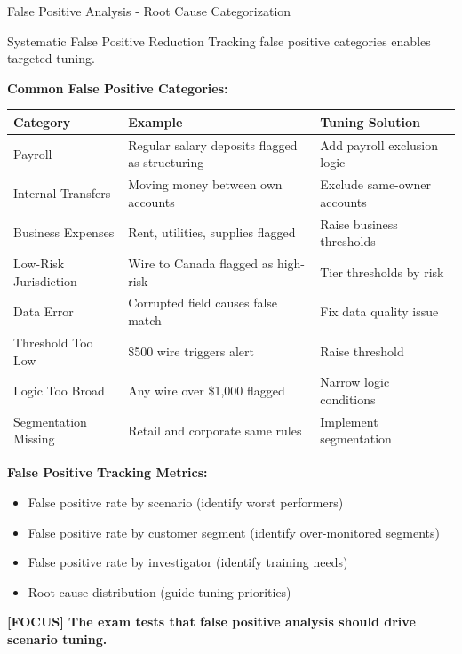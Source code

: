 \documentclass[11pt,a4paper]{beamer}
\newcommand{\examfocus}[1]{\textcolor{orange!80!black}{\textbf{[FOCUS] #1}}}
\begin{document}
	\begin{frame}{False Positive Analysis - Root Cause Categorization}
	\begin{block}{Systematic False Positive Reduction}
		Tracking false positive categories enables targeted tuning.
	\end{block}
	
	\textbf{Common False Positive Categories:}
	\begin{longtable}{p{}|p{}|p{}}
		\hline
		\rowcolor{lightgray}
		\textbf{Category} & \textbf{Example} & \textbf{Tuning Solution} \\
		\hline
		Payroll & Regular salary deposits flagged as structuring & Add payroll exclusion logic \\
		\hline
		Internal Transfers & Moving money between own accounts & Exclude same-owner accounts \\
		\hline
		Business Expenses & Rent, utilities, supplies flagged & Raise business thresholds \\
		\hline
		Low-Risk Jurisdiction & Wire to Canada flagged as high-risk & Tier thresholds by risk \\
		\hline
		Data Error & Corrupted field causes false match & Fix data quality issue \\
		\hline
		Threshold Too Low & \$500 wire triggers alert & Raise threshold \\
		\hline
		Logic Too Broad & Any wire over \$1,000 flagged & Narrow logic conditions \\
		\hline
		Segmentation Missing & Retail and corporate same rules & Implement segmentation \\
		\hline
	\end{longtable}
	
	\textbf{False Positive Tracking Metrics:}
	\begin{itemize}
		\item False positive rate by scenario (identify worst performers)
		\item False positive rate by customer segment (identify over-monitored segments)
		\item False positive rate by investigator (identify training needs)
		\item Root cause distribution (guide tuning priorities)
	\end{itemize}
	
	\examfocus{The exam tests that false positive analysis should drive scenario tuning.}
	\end{frame}
	
\end{document}
